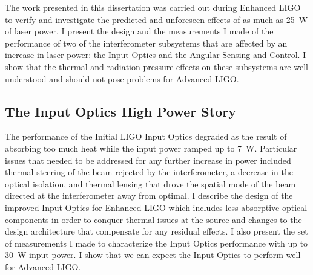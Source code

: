 The work presented in this dissertation was carried out during
Enhanced LIGO to verify and investigate the predicted and unforeseen
effects of as much as 25~W of laser power. I present the design and
the measurements I made of the performance of two of the
interferometer subsystems that are affected by an increase in laser
power: the Input Optics and the Angular Sensing and Control. I show
that the thermal and radiation pressure effects on these subsystems
are well understood and should not pose problems for
Advanced LIGO.




\subsection{The Input Optics High Power Story} 
The performance of the Initial LIGO Input Optics degraded as the
result of absorbing too much heat while the input power ramped up to
7~W. Particular issues that needed to be addressed for any further
increase in power included thermal steering of the beam rejected by
the interferometer, a decrease in the optical isolation, and thermal
lensing that drove the spatial mode of the beam directed at the
interferometer away from optimal. I describe the design of the
improved Input Optics for Enhanced LIGO which includes less absorptive
optical components in order to conquer thermal issues at the source
and changes to the design architecture that compensate for any
residual effects. I also present the set of measurements I made to
characterize the Input Optics performance with up to 30~W input
power. I show that we can expect the Input Optics to perform well for
Advanced LIGO.



